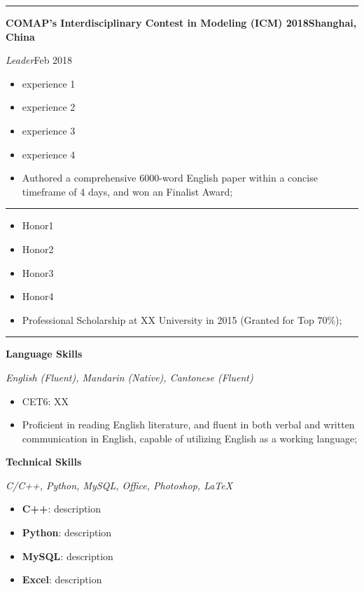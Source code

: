 \documentclass[11pt, a4paper, oneside]{article}
\begin{document}
\vspace{-0.5em}
\noindent\rule{\textwidth}{1pt}

\noindent \textbf{COMAP's Interdisciplinary Contest in Modeling (ICM) 2018}\hfill \textbf{Shanghai, China}

\textit{Leader}\hfill Feb 2018
\begin{itemize}
	\item experience 1
	\item experience 2
	\item experience 3
	\item experience 4
	\item Authored a comprehensive 6000-word English paper within a concise timeframe of 4 days, and won an Finalist Award;
\end{itemize}

\vspace{-0.5em}
\noindent\rule{\textwidth}{1pt}

\begin{itemize}
	\item Honor1
	\item Honor2
	\item Honor3
	\item Honor4
	\item Professional Scholarship at XX University in 2015 (Granted for Top 70\%);
\end{itemize}

\vspace{-0.5em}
\noindent\rule{\textwidth}{1pt}

\noindent \textbf{Language Skills}

\textit{English (Fluent), Mandarin (Native), Cantonese (Fluent)}
\begin{itemize}
	\item CET6: XX
	\item Proficient in reading English literature, and fluent in both verbal and written communication in English, capable of utilizing English as a working language;
\end{itemize}

\noindent \textbf{Technical Skills}

\textit{C/C++, Python, MySQL, Office, Photoshop, \LaTeX}
\begin{itemize}
	\item \textbf{C++}: description
	\item \textbf{Python}: description
	\item \textbf{MySQL}: description
	\item \textbf{Excel}: description
\end{itemize}

\thispagestyle{empty}
\end{document}
